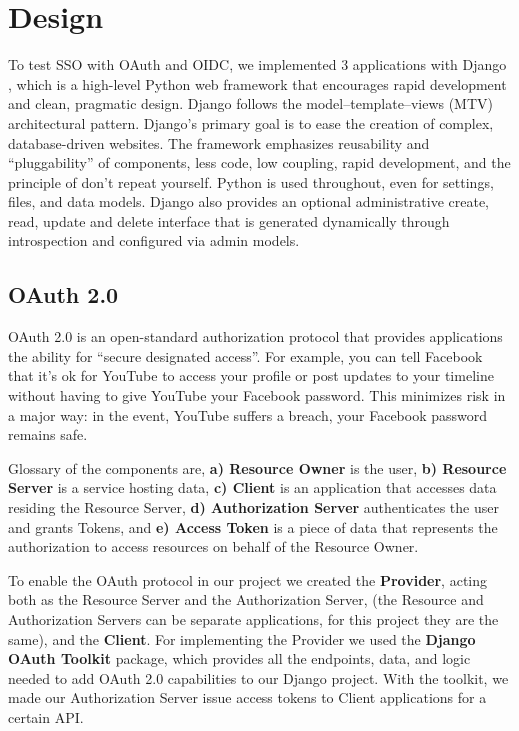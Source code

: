\section{Design}

To test SSO with OAuth and OIDC, we implemented 3 applications with Django \cite{Django}, which is a high-level Python web framework that encourages rapid development and clean, pragmatic design. Django follows the model–template–views (MTV) architectural pattern. Django's primary goal is to ease the creation of complex, database-driven websites. The framework emphasizes reusability and ``pluggability'' of components, less code, low coupling, rapid development, and the principle of don't repeat yourself. Python is used throughout, even for settings, files, and data models. Django also provides an optional administrative create, read, update and delete interface that is generated dynamically through introspection and configured via admin models.



\subsection{OAuth 2.0}

OAuth 2.0 \cite{oauthtoolkit} is an open-standard authorization protocol that provides applications the ability for ``secure designated access''. For example, you can tell Facebook that it’s ok for YouTube to access your profile or post updates to your timeline without having to give YouTube your Facebook password. This minimizes risk in a major way: in the event, YouTube suffers a breach, your Facebook password remains safe.

Glossary of the components are, \textbf{a) Resource Owner} is the user, \textbf{b) Resource Server} is a service hosting data, \textbf{c) Client} is an application that accesses data residing the Resource Server, \textbf{d) Authorization Server} authenticates the user and grants Tokens, and \textbf{e) Access Token} is a piece of data that represents the authorization to access resources on behalf of the Resource Owner.


To enable the OAuth protocol in our project we created the \textbf{Provider}, acting both as the Resource Server and the Authorization Server, (the Resource and Authorization Servers can be separate applications, for this project they are the same), and the \textbf{Client}.
For implementing the Provider we used the \textbf{Django OAuth Toolkit} package, which provides all the endpoints, data, and logic needed to add OAuth 2.0 capabilities to our Django project.
With the toolkit, we made our Authorization Server issue access tokens to Client applications for a certain API.

